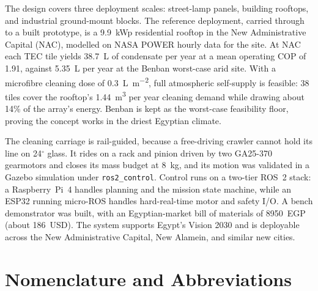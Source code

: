 \documentclass[12pt,a4paper]{report}   %
\begin{document}
The design covers three deployment scales: street-lamp panels, building rooftops,
and industrial ground-mount blocks. The reference deployment, carried through to a built
prototype, is a 9.9~kWp residential rooftop in the New Administrative Capital (NAC),
modelled on NASA POWER hourly data for the site. At NAC each TEC tile yields \SI{38.7}{\liter} of condensate per year at a
mean operating COP of 1.91, against \SI{5.35}{\liter} per year at the Benban worst-case
arid site. With a microfibre cleaning dose of \SI{0.3}{\liter\per\metre\squared}, full
atmospheric self-supply is feasible: 38 tiles cover the rooftop's
\SI{1.44}{\cubic\metre} per year cleaning demand while drawing about 14\% of the
array's energy. Benban is kept as the worst-case feasibility floor, proving the concept
works in the driest Egyptian climate.

The cleaning carriage is rail-guided, because a free-driving crawler cannot hold its
line on 24$^\circ$ glass. It rides on a rack and pinion driven by two GA25-370
gearmotors and closes its mass budget at 8~kg, and its motion was validated in a Gazebo
simulation under \texttt{ros2\_control}. Control runs on a two-tier ROS~2 stack: a
Raspberry~Pi~4 handles planning and the mission state machine, while an ESP32 running
micro-ROS handles hard-real-time motor and safety I/O. A bench demonstrator was built,
with an Egyptian-market bill of materials of \num{8950}~EGP (about \num{186}~USD). The
system supports Egypt's Vision 2030 and is deployable across the New Administrative
Capital, New Alamein, and similar new cities.

\tableofcontents
\listoffigures
\listoftables

\chapter*{Nomenclature and Abbreviations}
\thispagestyle{plain}
\end{document}
